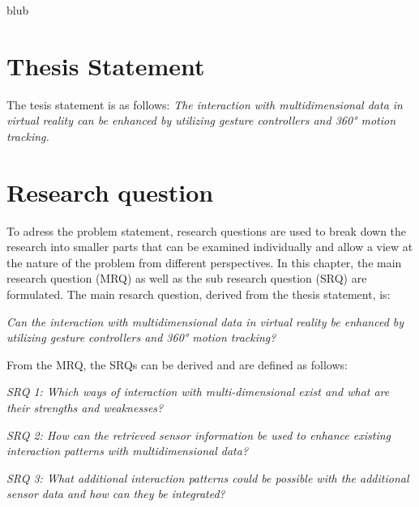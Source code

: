 blub



\section{Thesis Statement}

The tesis statement is as follows: \newline
\textit{The interaction with multidimensional data in virtual reality can be enhanced by utilizing gesture controllers and 360° motion tracking.}



\section{Research question}

To adress the problem statement, research questions are used to break down the research into smaller parts that can be examined individually and allow a view at the nature of the problem from different perspectives.
In this chapter, the main research question (MRQ) as well as the sub research question (SRQ) are formulated. \newline
The main resarch question, derived from the thesis statement, is:
\begin{framed}
	\textit{Can the interaction with multidimensional data in virtual reality be enhanced by utilizing gesture controllers and 360° motion tracking?}
\end{framed} \label{MRQ}
From the MRQ, the SRQs can be derived and are defined as follows:
\begin{framed}
	\textit{SRQ 1: Which ways of interaction with multi-dimensional exist and what are their strengths and weaknesses?}
\end{framed} \label{SRQ1}
\begin{framed}
	\textit{SRQ 2: How can the retrieved sensor information be used to enhance existing interaction patterns with multidimensional data?}
\end{framed} \label{SRQ2}
\begin{framed}
	\textit{SRQ 3: What additional interaction patterns could be possible with the additional sensor data and how can they be integrated?}
\end{framed} \label{SRQ3}
 

